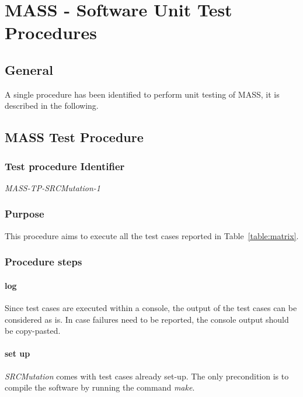 
\chapter{MASS - Software Unit Test Procedures}

\section{General}

A single procedure has been identified to perform unit testing of MASS, it is described in the following.

\section{MASS Test Procedure}

\subsection{Test procedure Identifier}

\emph{MASS-TP-SRCMutation-1}


\subsection{Purpose}

This procedure aims to execute all the test cases reported in Table~\ref{table:matrix}.

\subsection{Procedure steps}

\subsubsection{log}
Since test cases are executed within a console, the output of the test cases can be considered as is. 
In case failures need to be reported, the console output should be copy-pasted.
\subsubsection{set up}
\emph{SRCMutation} comes with test cases already set-up. The only precondition is to compile the software by running the command \emph{make}.
